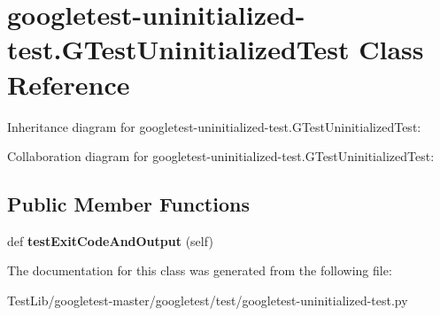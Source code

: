 \hypertarget{classgoogletest-uninitialized-test_1_1GTestUninitializedTest}{}\section{googletest-\/uninitialized-\/test.G\+Test\+Uninitialized\+Test Class Reference}
\label{classgoogletest-uninitialized-test_1_1GTestUninitializedTest}


Inheritance diagram for googletest-\/uninitialized-\/test.G\+Test\+Uninitialized\+Test\+:


Collaboration diagram for googletest-\/uninitialized-\/test.G\+Test\+Uninitialized\+Test\+:
\subsection*{Public Member Functions}
\begin{DoxyCompactItemize}
\item 
\mbox{\label{classgoogletest-uninitialized-test_1_1GTestUninitializedTest_aa3c5445f3d94a94d9b252fd64f05e4a0}} 
def {\bfseries test\+Exit\+Code\+And\+Output} (self)
\end{DoxyCompactItemize}


The documentation for this class was generated from the following file\+:\begin{DoxyCompactItemize}
\item 
Test\+Lib/googletest-\/master/googletest/test/googletest-\/uninitialized-\/test.\+py\end{DoxyCompactItemize}
